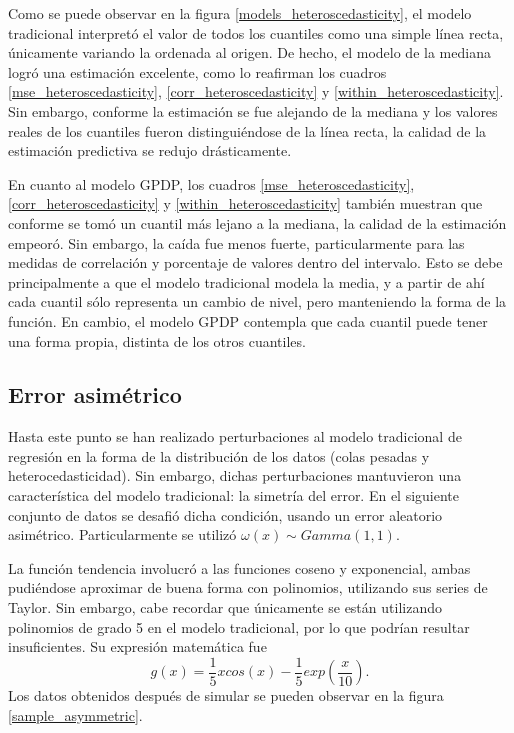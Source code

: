 Como se puede observar en la figura \ref{models_heteroscedasticity}, el modelo tradicional interpret\'o el valor de todos los cuantiles como una simple l\'inea recta, \'unicamente variando la ordenada al origen. De hecho, el modelo de la mediana logr\'o una estimaci\'on excelente, como lo reafirman los cuadros \ref{mse_heteroscedasticity}, \ref{corr_heteroscedasticity} y \ref{within_heteroscedasticity}. Sin embargo, conforme la estimaci\'on se fue alejando de la mediana y los valores reales de los cuantiles fueron distingui\'endose de la l\'inea recta, la calidad de la estimaci\'on predictiva se redujo dr\'asticamente.

En cuanto al modelo GPDP, los cuadros \ref{mse_heteroscedasticity}, \ref{corr_heteroscedasticity} y \ref{within_heteroscedasticity} tambi\'en muestran que conforme se tom\'o un cuantil m\'as lejano a la mediana, la calidad de la estimaci\'on empeor\'o. Sin embargo, la ca\'ida fue menos fuerte, particularmente para las medidas de correlaci\'on y porcentaje de valores dentro del intervalo. Esto se debe principalmente a que el modelo tradicional modela la media, y a partir de ah\'i cada cuantil s\'olo representa un cambio de nivel, pero manteniendo la forma de la funci\'on. En cambio, el modelo GPDP contempla que cada cuantil puede tener una forma propia, distinta de los otros cuantiles.

\subsection{Error asim\'etrico}

Hasta este punto se han realizado perturbaciones al modelo tradicional de regresi\'on en la forma de la distribuci\'on de los datos (colas pesadas y heterocedasticidad). Sin embargo, dichas perturbaciones mantuvieron una caracter\'istica del modelo tradicional: la simetr\'ia del error. En el siguiente conjunto de datos se desafi\'o dicha condici\'on, usando un error aleatorio asim\'etrico. Particularmente se utiliz\'o $\omega(x) \sim Gamma(1,1)$.

La funci\'on tendencia involucr\'o a las funciones coseno y exponencial, ambas pudi\'endose aproximar de buena forma con polinomios, utilizando sus series de Taylor. Sin embargo, cabe recordar que \'unicamente se est\'an utilizando polinomios de grado 5 en el modelo tradicional, por lo que podr\'ian resultar insuficientes. Su expresi\'on matem\'atica fue
\begin{equation*}
    g(x) = \frac{1}{5} x cos(x) - \frac{1}{5}exp\left(\frac{x}{10}\right).
\end{equation*}
Los datos obtenidos despu\'es de simular se pueden observar en la figura \ref{sample_asymmetric}.


